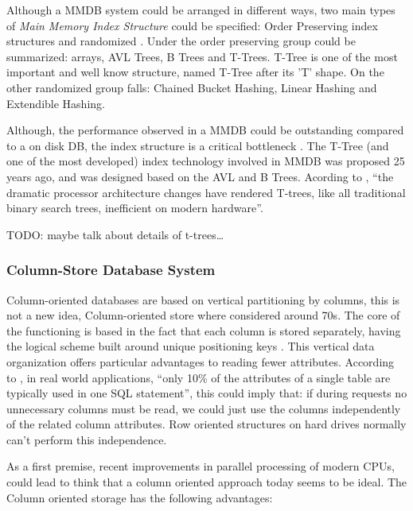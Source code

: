 \documentclass[10pt]{article} %
\begin{document}
 Although a MMDB system could be arranged in different ways, two main types of \emph{ Main Memory Index Structure } could be specified: Order Preserving index structures and randomized \cite{lehman1986study}. Under the order preserving group could be summarized: arrays, AVL Trees, B Trees and T-Trees. T-Tree is one of the most important and well know structure, named T-Tree after its 'T' shape. On the other randomized group falls: Chained Bucket Hashing, Linear Hashing and Extendible Hashing.

Although, the performance observed in a MMDB could be outstanding compared to a on disk DB, the index structure is a critical bottleneck \cite{leisadaptive}. The T-Tree (and one of the most developed) index technology involved in MMDB was proposed 25 years ago, and was designed based on the AVL and B Trees. Acording to , ``the dramatic processor architecture changes have rendered T-trees, like all traditional binary search trees, inefficient on modern hardware''.

TODO: maybe talk about details of t-trees\ldots 


\subsubsection{Column-Store Database System}

Column-oriented databases are based on vertical partitioning by columns, this is not a new idea, Column-oriented store where considered around 70s. The core of the functioning is based in the fact that each column is stored separately, having the logical scheme built around unique positioning keys \cite{krueger2011main}. This vertical data organization offers particular advantages to reading fewer attributes. According to \cite{Plattner}, in real world applications, ``only 10\% of the attributes of a single table are typically used in one SQL statement'', this could imply that: if during requests no unnecessary columns must be read, we could just use the columns independently of the related column attributes. Row oriented structures on hard drives normally can't perform this independence.

As a first premise, recent improvements in parallel processing of modern CPUs, could lead to think that a column oriented approach today seems to be ideal. The Column oriented storage has the following advantages: 
\end{document}

